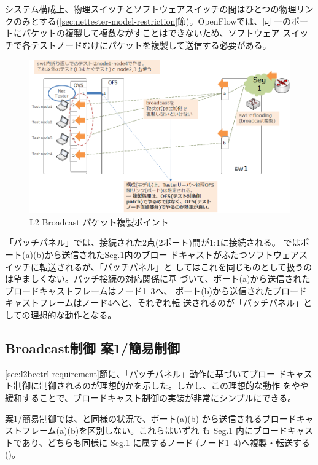 システム構成上、物理スイッチとソフトウェアスイッチの間はひとつの物理リン
クのみとする(\ref{sec:nettester-model-restriction}節)。OpenFlowでは、同
一のポートにパケットの複製して複数ながすことはできないため、ソフトウェア
スイッチで各テストノードむけにパケットを複製して送信する必要がある。

\begin{figure}[h]
 \centering
 \includegraphics[scale=0.6]{img/l2bcctrl_req4.png}
 \caption{L2 Broadcast パケット複製ポイント}
 \label{fig:l2bcctrl_req4}
\end{figure}

「パッチパネル」では、接続された2点(2ポート)間が1:1に接続される。
ではポート(a)(b)から送信されたSeg.1内のブロー
ドキャストがふたつソフトウェアスイッチに転送されるが、「パッチパネル」と
してはこれを同じものとして扱うのは望ましくない。パッチ接続の対応関係に基
づいて、ポート(a)から送信されたブロードキャストフレームはノード1--3へ、
ポート(b)から送信されたブロードキャストフレームはノード4へと、それぞれ転
送されるのが「パッチパネル」としての理想的な動作となる。

  \subsection{Broadcast制御 案1/簡易制御}
  \label{sec:l2bcctrl-plan1}

\ref{sec:l2bcctrl-requirement}節に、「パッチパネル」動作に基づいてブロー
ドキャスト制御に制御されるのが理想的かを示した。しかし、この理想的な動作
をやや緩和することで、ブロードキャスト制御の実装が非常にシンプルにできる。

案1/簡易制御では、と同様の状況で、ポート(a)(b)
から送信されるブロードキャストフレーム(a)(b)を区別しない。これらはいずれ
も Seg.1 内にブロードキャストであり、どちらも同様に Seg.1 に属するノード
(ノード1--4)へ複製・転送する()。

